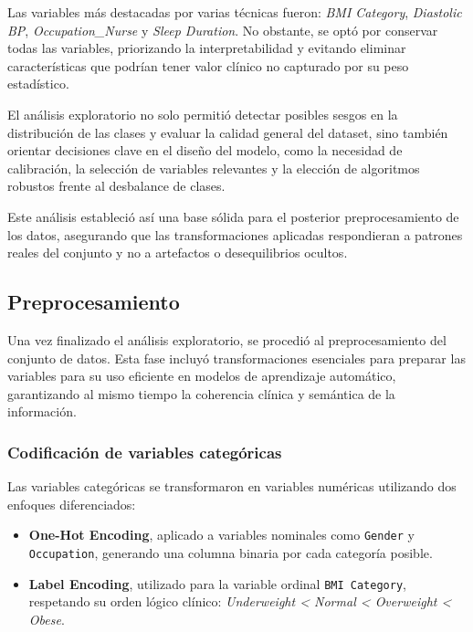 Las variables más destacadas por varias técnicas fueron: \textit{BMI Category}, \textit{Diastolic BP}, \textit{Occupation\_Nurse} y \textit{Sleep Duration}. No obstante, se optó por conservar todas las variables, priorizando la interpretabilidad y evitando eliminar características que podrían tener valor clínico no capturado por su peso estadístico.


El análisis exploratorio no solo permitió detectar posibles sesgos en la distribución de las clases y evaluar la calidad general del dataset, sino también orientar decisiones clave en el diseño del modelo, como la necesidad de calibración, la selección de variables relevantes y la elección de algoritmos robustos frente al desbalance de clases. 

Este análisis estableció así una base sólida para el posterior preprocesamiento de los datos, asegurando que las transformaciones aplicadas respondieran a patrones reales del conjunto y no a artefactos o desequilibrios ocultos.



\subsection{Preprocesamiento}

Una vez finalizado el análisis exploratorio, se procedió al preprocesamiento del conjunto de datos. Esta fase incluyó transformaciones esenciales para preparar las variables para su uso eficiente en modelos de aprendizaje automático, garantizando al mismo tiempo la coherencia clínica y semántica de la información.


\subsubsection{Codificación de variables categóricas}

Las variables categóricas se transformaron en variables numéricas utilizando dos enfoques diferenciados:

\begin{itemize}
    \item \textbf{One-Hot Encoding}, aplicado a variables nominales como \texttt{Gender} y \texttt{Occupation}, generando una columna binaria por cada categoría posible.
    \item \textbf{Label Encoding}, utilizado para la variable ordinal \texttt{BMI Category}, respetando su orden lógico clínico: \textit{Underweight < Normal < Overweight < Obese}.
\end{itemize}

